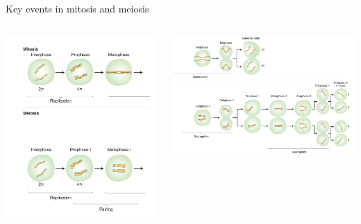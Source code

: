 \documentclass[11pt,ignorenonframetext,aspectratio=169]{beamer}
\begin{document}
\begin{frame}{Key events in mitosis and meiosis}
\protect\hypertarget{key-events-in-mitosis-and-meiosis}{}
\begin{columns}[T,onlytextwidth]



\begin{center}\includegraphics[width=0.68\linewidth]{../images/key_events_mitosis_meiosis} \end{center}


\begin{center}\includegraphics[width=1\linewidth]{../images/key_events_mitosis_meiosis2} \end{center}

\end{columns}
\end{frame}
\end{document}
